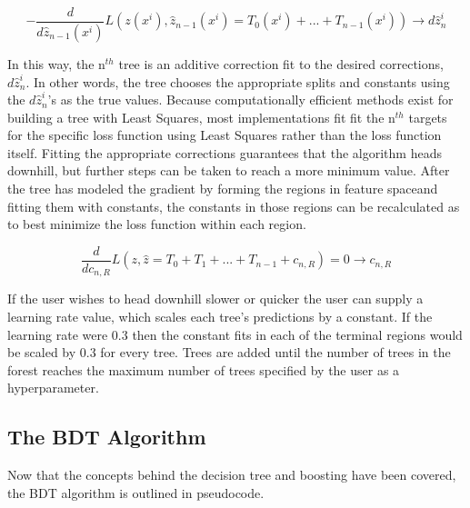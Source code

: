 \documentclass[12pt]{article}
\begin{document}
\begin{equation}
-\frac{d}{d\hat{z}_{n-1}(x^i)}L(z(x^i),\hat{z}_{n-1}(x^i) = T_0(x^i)+...+T_{n-1}(x^i)) \rightarrow d\hat{z}^{i}_{n}
\end{equation}

In this way, the n$^{th}$ tree is an additive correction fit to the desired corrections, $d\hat{z}^{i}_{n}$. In other words, the tree chooses the appropriate splits and constants using the $d\hat{z}^{i}_{n}$'s as the true values. Because computationally efficient methods exist for building a tree with Least Squares, most implementations fit fit the n$^{th}$ targets for the specific loss function using Least Squares rather than the loss function itself. Fitting the appropriate corrections guarantees that the algorithm heads downhill, but further steps can be taken to reach a more minimum value. After the tree has modeled the gradient by forming the regions in feature spaceand fitting them with constants, the constants in those regions can be recalculated as to best minimize the loss function within each region. 

\begin{equation}
\frac{d}{dc_{n,R}} L(z,\hat{z} = T_0 + T_1 + ... + T_{n-1} + c_{n,R}) = 0 \rightarrow c_{n,R}
\end{equation}

If the user wishes to head downhill slower or quicker the user can supply a learning rate value, which scales each tree's predictions by a constant. If the learning rate were 0.3 then the constant fits in each of the terminal regions would be scaled by 0.3 for every tree. Trees are added until the number of trees in the forest reaches the maximum number of trees specified by the user as a hyperparameter.


\subsection{The BDT Algorithm}

Now that the concepts behind the decision tree and boosting have been covered, the BDT algorithm is outlined in pseudocode.
\end{document}
